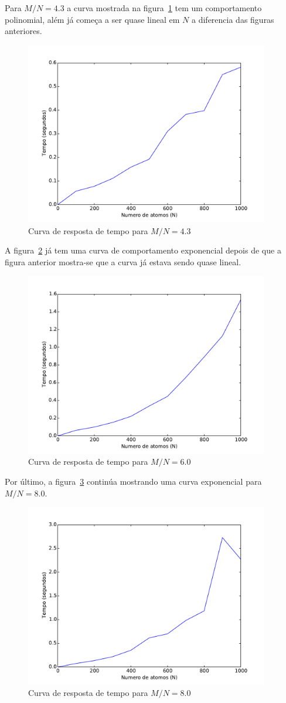 		Para $M/N=4.3$ a curva mostrada na figura~\ref{fig:max2satmn43} tem um comportamento polinomial, além já começa a ser quase lineal em $N$ a diferencia das figuras anteriores.
		\begin{figure}[H]
			\centering
			\includegraphics[height=8cm]{images/max2sat_mn43}
			\caption{Curva de resposta de tempo para $M/N=4.3$}
			\label{fig:max2satmn43}
		\end{figure}
		
		A figura~\ref{fig:max2satmn60} já tem uma curva de comportamento exponencial depois de que a figura anterior mostra-se que a curva já estava sendo quase lineal.
		\begin{figure}[H]
			\centering
			\includegraphics[height=8cm]{images/max2sat_mn60}
			\caption{Curva de resposta de tempo para $M/N=6.0$}
			\label{fig:max2satmn60}
		\end{figure}
		
		Por último, a figura~\ref{fig:max2satmn80} continúa mostrando uma curva exponencial para $M/N=8.0$.
		\begin{figure}[H]
			\centering
			\includegraphics[height=8cm]{images/max2sat_mn80}
			\caption{Curva de resposta de tempo para $M/N=8.0$}
			\label{fig:max2satmn80}
		\end{figure}